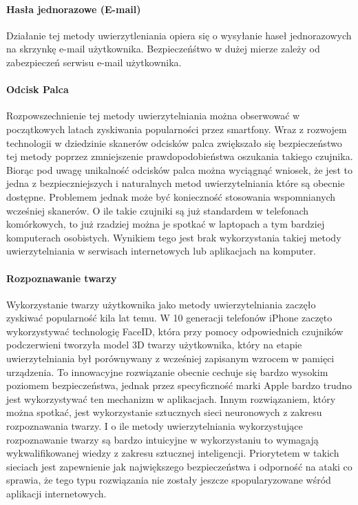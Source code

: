 \paragraph{Hasła jednorazowe (E-mail)} Działanie tej metody uwierzytleniania opiera się o wysyłanie haseł jednorazowych na skrzynkę e-mail użytkownika. Bezpieczeńśtwo w dużej mierze zależy od zabezpieczeń serwisu e-mail użytkownika. 
\paragraph{Odcisk Palca} Rozpowszechnienie tej metody uwierzytelniania można obserwować w początkowych latach zyskiwania popularności przez smartfony. Wraz z rozwojem technologii w dziedzinie skanerów odcisków palca zwiększało się bezpieczeństwo tej metody poprzez zmniejszenie prawdopodobieństwa oszukania takiego czujnika. Biorąc pod uwagę unikalność odcisków palca można wyciągnąć wniosek, że jest to jedna z bezpieczniejszych i naturalnych metod uwierzytelniania które są obecnie dostępne. Problemem jednak może być konieczność stosowania wspomnianych wcześniej skanerów. O ile takie czujniki są już standardem w telefonach komórkowych, to już rzadziej można je spotkać w laptopach a tym bardziej komputerach osobistych. Wynikiem tego jest brak wykorzystania takiej metody uwierzytelniania w serwisach internetowych lub aplikacjach na komputer.
\paragraph{Rozpoznawanie twarzy} Wykorzystanie twarzy użytkownika jako metody uwierzytelniania zaczęło zyskiwać popularność kila lat temu. W 10 generacji telefonów iPhone zaczęto wykorzystywać technologię FaceID, która przy pomocy odpowiednich czujników podczerwieni tworzyła model 3D twarzy użytkownika, który na etapie uwierzytelniania był porównywany z wcześniej zapisanym wzrocem w pamięci urządzenia. To innowacyjne rozwiązanie obecnie cechuje się bardzo wysokim poziomem bezpieczeństwa, jednak przez specyficzność marki Apple bardzo trudno jest wykorzystywać ten mechanizm w aplikacjach. Innym rozwiązaniem, który można spotkać, jest wykorzystanie sztucznych sieci neuronowych z zakresu rozpoznawania twarzy. I o ile metody uwierzytelniania wykorzystujące rozpoznawanie twarzy są bardzo intuicyjne w wykorzystaniu to wymagają wykwalifikowanej wiedzy z zakresu sztucznej inteligencji. Priorytetem w takich sieciach jest zapewnienie jak największego bezpieczeństwa i odporność na ataki co sprawia, że tego typu rozwiązania nie zostały jeszcze spopularyzowane wśród aplikacji internetowych.
 

